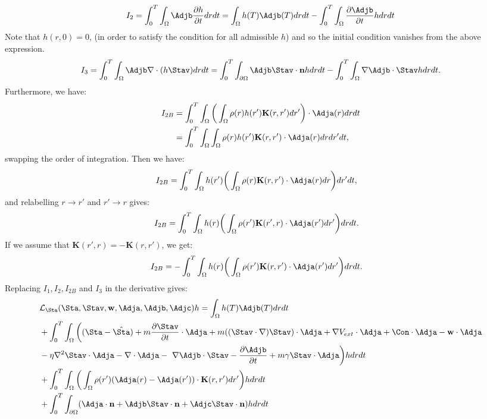 \begin{align*}
I_2 = \int_0^T \int_\Omega \Adjb\frac{\partial h}{\partial t} dr dt = \int_\Omega h(T) \Adjb(T) dr dt - \int_0^T \int_\Omega  \frac{\partial \Adjb}{\partial t}h dr dt
\end{align*}
Note that ${h}(r,0)=0$, (in order to satisfy the condition for all admissible ${h}$) and so the initial condition vanishes from the above expression.
\begin{align*}
I_3= \int_0^T \int_\Omega \Adjb\nabla \cdot (h \Stav) dr dt = \int_0^T \int_{\partial \Omega} \Adjb \Stav \cdot \mathbf{n} h dr dt - \int_0^T \int_\Omega \nabla \Adjb \cdot \Stav h dr dt.
\end{align*}
Furthermore, we have:
\begin{align*}
I_{2B}&= \int_0^T \int_\Omega \bigg(\int_\Omega \rho(r) h(r') \mathbf{K}(r,r')dr'\bigg) \cdot \Adja(r) drdt\\
&=\int_0^T \int_\Omega \int_\Omega \rho(r) h(r') \mathbf{K}(r,r') \cdot \Adja(r) drdr'dt,
\end{align*}
swapping the order of integration. Then we have:
\begin{align*}
I_{2B}&= \int_0^T \int_\Omega  h(r')\bigg(\int_\Omega  \rho(r)\mathbf{K}(r,r')\cdot \Adja(r) dr \bigg)dr'dt,
\end{align*}
and relabelling $r \to r'$ and $r' \to r$ gives:
\begin{align*}
I_{2B}&= \int_0^T \int_\Omega  h(r)\bigg(\int_\Omega  \rho(r')\mathbf{K}(r',r) \cdot \Adja(r') dr' \bigg)drdt.
\end{align*}
If we assume that $\mathbf{K}(r',r) = - \mathbf{K}(r,r')$, we get:
\begin{align*}
I_{2B}&= -\int_0^T \int_\Omega  h(r)\bigg(\int_\Omega  \rho(r')\mathbf{K}(r,r') \cdot \Adja(r') dr' \bigg)drdt.
\end{align*}
Replacing $I_1, I_2, I_{2B}$ and $I_3$ in the derivative gives:
\begin{align*}
&\mathcal{L}_\Sta(\Sta,\Stav,\mathbf{w},\Adja,\Adjb,\Adjc)h = \int_\Omega h(T) \Adjb(T) dr dt  \\
&+ \int_0^T \int_\Omega \bigg( (\Sta - \hat \Sta) +m  \frac{\partial \Stav}{\partial t}\cdot \Adja + m  ((\Stav \cdot \nabla)\Stav )\cdot \Adja+ \nabla V_{ext}\cdot \Adja + \Con \cdot \Adja - \mathbf{w} \cdot \Adja \\
&- \eta \nabla^2 \Stav \cdot \Adja -\nabla\cdot \Adja  - \ \nabla \Adjb \cdot \Stav  -  \frac{\partial \Adjb}{\partial t} + m \gamma \Stav \cdot \Adja\bigg) h dr dt \\
&+ \int_0^T \int_\Omega  \bigg(\int_\Omega  \rho(r')(\Adja(r) - \Adja(r')) \cdot\mathbf{K}(r,r')   dr'  \bigg)hdr dt\\
&+\int_0^T \int_{\partial \Omega} ( \Adja \cdot \mathbf{n}  +  \Adjb \Stav \cdot \mathbf{n}   +\Adjc \Stav \cdot \mathbf{n})h  dr dt
\end{align*}
